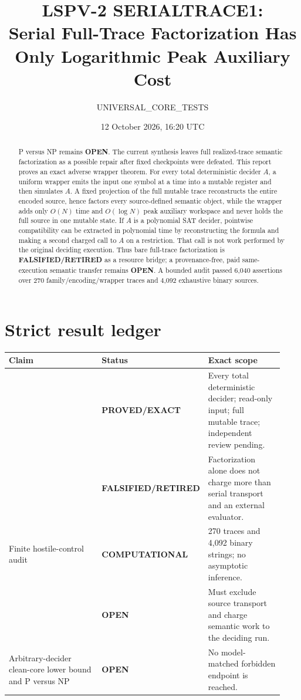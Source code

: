 \documentclass[11pt]{article}
\title{LSPV-2 SERIALTRACE1:\\
Serial Full-Trace Factorization Has Only Logarithmic Peak Auxiliary Cost}
\author{UNIVERSAL\_CORE\_TESTS}
\date{12 October 2026, 16:20 UTC}
\newcommand{\EXACT}{\textbf{PROVED/EXACT}}
\newcommand{\COMP}{\textbf{COMPUTATIONAL}}
\newcommand{\OPEN}{\textbf{OPEN}}
\newcommand{\RETIRED}{\textbf{FALSIFIED/RETIRED}}
\newcommand{\claim}[1]{\texttt{\detokenize{#1}}}
\begin{document}
\sloppy
\maketitle

\begin{abstract}
P versus NP remains \OPEN.  The current synthesis leaves full realized-trace
semantic factorization as a possible repair after fixed checkpoints were
defeated.  This report proves an exact adverse wrapper theorem.  For every
total deterministic decider $A$, a uniform wrapper emits the input one symbol
at a time into a mutable register and then simulates $A$.  A fixed projection
of the full mutable trace reconstructs the entire encoded source, hence
factors every source-defined semantic object, while the wrapper adds only
$O(N)$ time and $O(\log N)$ peak auxiliary workspace and never holds the full
source in one mutable state.  If $A$ is a polynomial SAT decider, pointwise
compatibility can be extracted in polynomial time by reconstructing the
formula and making a second charged call to $A$ on a restriction.  That call
is not work performed by the original deciding execution.  Thus bare
full-trace factorization is \RETIRED{} as a resource bridge; a provenance-free,
paid same-execution semantic transfer remains \OPEN.  A bounded audit passed
6,040 assertions over 270 family/encoding/wrapper traces and 4,092 exhaustive
binary sources.
\end{abstract}

\section{Strict result ledger}

\begin{center}\small
\begin{tabular}{@{}p{0.42\linewidth}p{0.20\linewidth}p{0.31\linewidth}@{}}
\toprule
Claim & Status & Exact scope\\ \midrule
\claim{SERIAL-TRACE-SOURCE-INJECTION1} & \EXACT & Every total deterministic decider; read-only input; full mutable trace; independent review pending.\\
\claim{BARE-FULL-TRACE-FACTORIZATION-AS-RESOURCE1} & \RETIRED & Factorization alone does not charge more than serial transport and an external evaluator.\\
Finite hostile-control audit & \COMP & 270 traces and 4,092 binary strings; no asymptotic inference.\\
\claim{PAID-PROVENANCE-FREE-SAME-EXECUTION-TRANSFER1} & \OPEN & Must exclude source transport and charge semantic work to the deciding run.\\
Arbitrary-decider clean-core lower bound and P versus NP & \OPEN & No model-matched forbidden endpoint is reached.\\
\bottomrule
\end{tabular}
\end{center}
\end{document}
